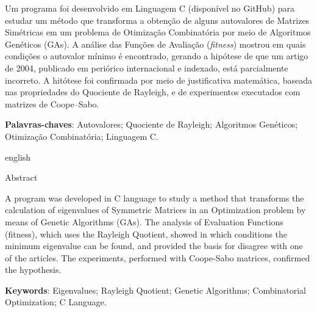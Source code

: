 \thispagestyle{empty}
\begin{resumo}
Um programa foi desenvolvido em Linguagem C (disponível no GitHub) para estudar um método que transforma a obtenção de alguns autovalores de Matrizes Simétricas em um problema de Otimização Combinatória por meio de Algoritmos Genéticos (GAs). A análise das Funções de Avaliação (\emph{fitness}) mostrou em quais condições o autovalor mínimo é encontrado, gerando a hipótese de que um artigo de 2004, publicado em periórico internacional e indexado, está parcialmente incorreto. A hitótese foi confirmada por meio de justificativa matemática, baseada nas propriedades do Quociente de Rayleigh, e de experimentos executados com matrizes de Coope--Sabo.
     
    \vspace{\onelineskip}

    \noindent\textbf{Palavras-chaves}: Autovalores; Quociente de Rayleigh; Algoritmos Genéticos; Otimização Combinatória; Linguagem C.

    \vspace{\onelineskip}
    \vspace{\onelineskip}
		
    \begin{otherlanguage*}{english}
    \begin{center}{\ABNTEXchapterfont\huge Abstract}\end{center}
    
    A program was developed in C language to study a method that transforms the calculation of eigenvalues of Symmetric Matrices in an Optimization problem by means of Genetic Algorithms (GAs). The analysis of Evaluation Functions (fitness), which uses the Rayleigh Quotient, showed in which conditions the minimum eigenvalue can be found, and provided the basis for disagree with one of the articles. The experiments, performed with Coope-Sabo matrices, confirmed the hypothesis.
		
    \vspace{\onelineskip}

    \noindent\textbf{Keywords}: Eigenvalues; Rayleigh Quotient; Genetic Algorithms; Combinatorial Optimization; C Language.

    \end{otherlanguage*}
		
    


		
\end{resumo}

